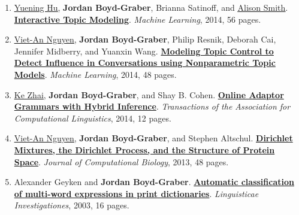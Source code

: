{\begin{enumerate}
	 \item \underline{\href{https://scholar.google.com/citations?user=mO_62fQAAAAJ&hl=en}{Yuening Hu}}, {\bf Jordan Boyd-Graber}, Brianna Satinoff, and \underline{\href{http://alisonmsmith.github.io/}{Alison Smith}}.  {\bf \href{http://cs.umd.edu/~jbg//docs/2014_mlj_itm.pdf}{Interactive Topic Modeling}}.  \emph{Machine Learning}, 2014, 56 pages.

	 \item \underline{\href{https://viet-an.github.io/}{Viet-An Nguyen}}, {\bf Jordan Boyd-Graber}, Philip Resnik, Deborah Cai, Jennifer Midberry, and Yuanxin Wang.  {\bf \href{http://cs.umd.edu/~jbg//docs/2014_mlj_influencer.pdf}{Modeling Topic Control to Detect Influence in Conversations using Nonparametric Topic Models}}.  \emph{Machine Learning}, 2014, 48 pages.

	 \item \underline{\href{https://kzhai.github.io/}{Ke Zhai}}, {\bf Jordan Boyd-Graber}, and Shay B. Cohen.  {\bf \href{http://cs.umd.edu/~jbg//docs/2014_tacl_ag_vb_online.pdf}{Online Adaptor Grammars with Hybrid Inference}}.  \emph{Transactions of the Association for Computational Linguistics}, 2014, 12 pages.

	 \item \underline{\href{https://viet-an.github.io/}{Viet-An Nguyen}}, {\bf Jordan Boyd-Graber}, and Stephen Altschul.  {\bf \href{http://cs.umd.edu/~jbg//docs/2013_dp_protein.pdf}{Dirichlet Mixtures, the Dirichlet Process, and the Structure of Protein Space}}.  \emph{Journal of Computational Biology}, 2013, 48 pages.

	 \item Alexander Geyken and {\bf Jordan Boyd-Graber}.  {\bf \href{http://cs.umd.edu/~jbg//docs/idioms.pdf}{Automatic classification of multi-word expressions in print dictionaries}}.  \emph{Linguisticae Investigationes}, 2003, 16 pages.


\end{enumerate}
}
